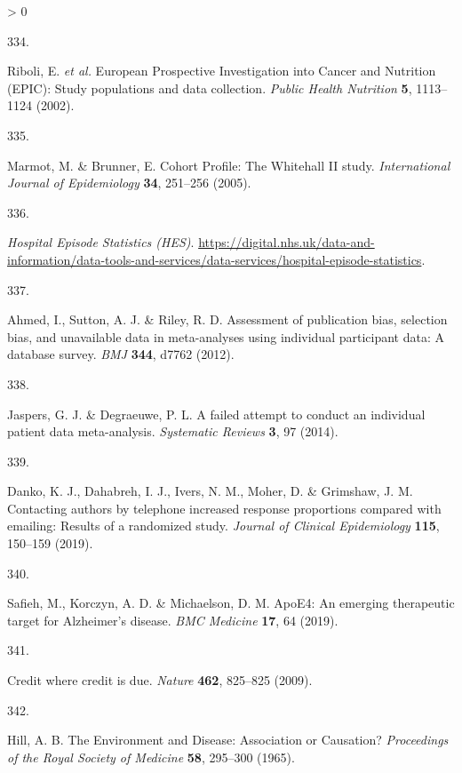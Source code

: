 \documentclass[a4paper, twoside]{templates/ociamthesis}
\newlength{\cslhangindent}
\newlength{\csllabelwidth}
\newenvironment{CSLReferences}[3] %
 {%
  \setlength{\parindent}{0pt}
  \ifodd #1 \everypar{\setlength{\hangindent}{\cslhangindent}}\ignorespaces\fi
  \ifnum #2 > 0
  \setlength{\parskip}{#2\baselineskip}
  \fi
 }%
 {}
\newcommand{\CSLLeftMargin}[1]{\parbox[t]{\maxof{\widthof{#1}}{\csllabelwidth}}{#1}}
\newcommand{\CSLRightInline}[1]{\parbox[t]{\linewidth - \csllabelwidth}{#1}}
\begin{document}
\begin{CSLReferences}{0}{0}
\leavevmode\hypertarget{ref-riboli2002}{}%
\CSLLeftMargin{334. }
\CSLRightInline{Riboli, E. \emph{et al.} European {Prospective Investigation} into {Cancer} and {Nutrition} ({EPIC}): Study populations and data collection. \emph{Public Health Nutrition} \textbf{5}, 1113--1124 (2002).}

\leavevmode\hypertarget{ref-marmot2005}{}%
\CSLLeftMargin{335. }
\CSLRightInline{Marmot, M. \& Brunner, E. Cohort {Profile}: The {Whitehall II} study. \emph{International Journal of Epidemiology} \textbf{34}, 251--256 (2005).}

\leavevmode\hypertarget{ref-zotero-15403}{}%
\CSLLeftMargin{336. }
\CSLRightInline{\emph{Hospital {Episode Statistics} ({HES})}. \url{https://digital.nhs.uk/data-and-information/data-tools-and-services/data-services/hospital-episode-statistics}.}

\leavevmode\hypertarget{ref-ahmed2012}{}%
\CSLLeftMargin{337. }
\CSLRightInline{Ahmed, I., Sutton, A. J. \& Riley, R. D. Assessment of publication bias, selection bias, and unavailable data in meta-analyses using individual participant data: A database survey. \emph{BMJ} \textbf{344}, d7762 (2012).}

\leavevmode\hypertarget{ref-jaspers2014}{}%
\CSLLeftMargin{338. }
\CSLRightInline{Jaspers, G. J. \& Degraeuwe, P. L. A failed attempt to conduct an individual patient data meta-analysis. \emph{Systematic Reviews} \textbf{3}, 97 (2014).}

\leavevmode\hypertarget{ref-danko2019}{}%
\CSLLeftMargin{339. }
\CSLRightInline{Danko, K. J., Dahabreh, I. J., Ivers, N. M., Moher, D. \& Grimshaw, J. M. Contacting authors by telephone increased response proportions compared with emailing: Results of a randomized study. \emph{Journal of Clinical Epidemiology} \textbf{115}, 150--159 (2019).}

\leavevmode\hypertarget{ref-safieh2019}{}%
\CSLLeftMargin{340. }
\CSLRightInline{Safieh, M., Korczyn, A. D. \& Michaelson, D. M. {ApoE4}: An emerging therapeutic target for {Alzheimer}'s disease. \emph{BMC Medicine} \textbf{17}, 64 (2019).}

\leavevmode\hypertarget{ref-nature2009}{}%
\CSLLeftMargin{341. }
\CSLRightInline{Credit where credit is due. \emph{Nature} \textbf{462}, 825--825 (2009).}

\leavevmode\hypertarget{ref-hill1965}{}%
\CSLLeftMargin{342. }
\CSLRightInline{Hill, A. B. The {Environment} and {Disease}: Association or {Causation}? \emph{Proceedings of the Royal Society of Medicine} \textbf{58}, 295--300 (1965).}


\end{CSLReferences}
\end{document}
